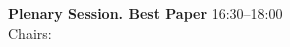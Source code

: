 {\bfseries\large Plenary Session. Best Paper } \hfill 16:30--18:00 \\
\TrackDLoc\hfill Chairs: \sessionchair{}{}
\\
\\

